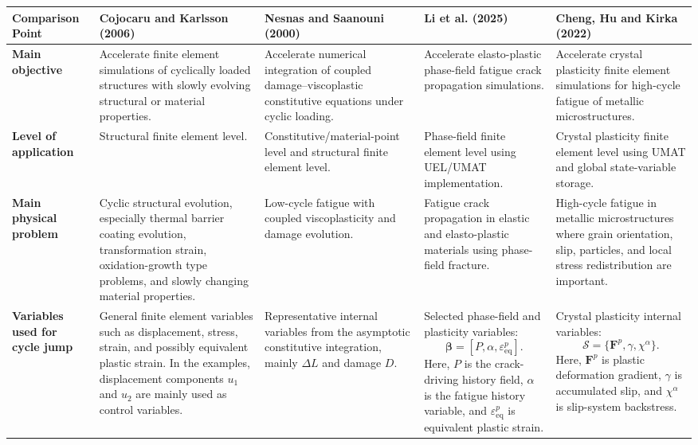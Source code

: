 ﻿\documentclass[11pt,a4paper]{article}
\begin{document}
\begin{landscape}
\begin{table}[htbp]
\centering
\scriptsize
\renewcommand{\arraystretch}{1.35}
\begin{tabularx}{\linewidth}{p{3.1cm} Y Y Y Y}
\toprule
\textbf{Comparison Point}
&
\textbf{Cojocaru and Karlsson (2006)}
&
\textbf{Nesnas and Saanouni (2000)}
&
\textbf{Li et al. (2025)}
&
\textbf{Cheng, Hu and Kirka (2022)}
\\
\midrule

\textbf{Main objective}
&
Accelerate finite element simulations of cyclically loaded structures with slowly evolving structural or material properties.
&
Accelerate numerical integration of coupled damage--viscoplastic constitutive equations under cyclic loading.
&
Accelerate elasto-plastic phase-field fatigue crack propagation simulations.
&
Accelerate crystal plasticity finite element simulations for high-cycle fatigue of metallic microstructures.
\\

\midrule

\textbf{Level of application}
&
Structural finite element level.
&
Constitutive/material-point level and structural finite element level.
&
Phase-field finite element level using UEL/UMAT implementation.
&
Crystal plasticity finite element level using UMAT and global state-variable storage.
\\

\midrule

\textbf{Main physical problem}
&
Cyclic structural evolution, especially thermal barrier coating evolution, transformation strain, oxidation-growth type problems, and slowly changing material properties.
&
Low-cycle fatigue with coupled viscoplasticity and damage evolution.
&
Fatigue crack propagation in elastic and elasto-plastic materials using phase-field fracture.
&
High-cycle fatigue in metallic microstructures where grain orientation, slip, particles, and local stress redistribution are important.
\\

\midrule

\textbf{Variables used for cycle jump}
&
General finite element variables such as displacement, stress, strain, and possibly equivalent plastic strain. In the examples, displacement components $u_1$ and $u_2$ are mainly used as control variables.
&
Representative internal variables from the asymptotic constitutive integration, mainly $\Delta L$ and damage $D$.
&
Selected phase-field and plasticity variables:
\[
\bm{\beta}=[P,\alpha,\varepsilon_{\mathrm{eq}}^p].
\]
Here, $P$ is the crack-driving history field, $\alpha$ is the fatigue history variable, and $\varepsilon_{\mathrm{eq}}^p$ is equivalent plastic strain.
&
Crystal plasticity internal variables:
\[
\bm{\mathcal{S}}=\{\bm{F}^p,\gamma,\chi^\alpha\}.
\]
Here, $\bm{F}^p$ is plastic deformation gradient, $\gamma$ is accumulated slip, and $\chi^\alpha$ is slip-system backstress.
\\


\end{tabularx}
\end{table}
\end{landscape}
\end{document}
